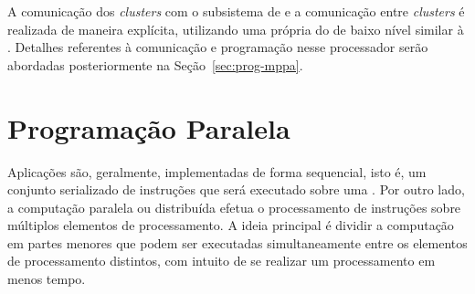 A comunicação dos \textit{clusters} com o subsistema de \es e a comunicação
entre \textit{clusters} é realizada de maneira explícita, utilizando uma \api
própria do \mppa de baixo nível similar à \posix \ipc. Detalhes referentes à
comunicação e programação nesse processador serão abordadas posteriormente
na Seção~\ref{sec:prog-mppa}.




\section{Programação Paralela}
\label{sec:prog-paralela}

Aplicações são, geralmente, implementadas de forma
sequencial, isto é, um conjunto serializado de instruções que será executado
sobre uma \cpu. Por outro lado, a computação paralela ou distribuída efetua o
processamento de instruções sobre múltiplos elementos de processamento. A ideia
principal é dividir a computação em partes menores que podem ser executadas
simultaneamente entre os elementos de processamento distintos, com intuito de se
realizar um processamento em menos tempo.

